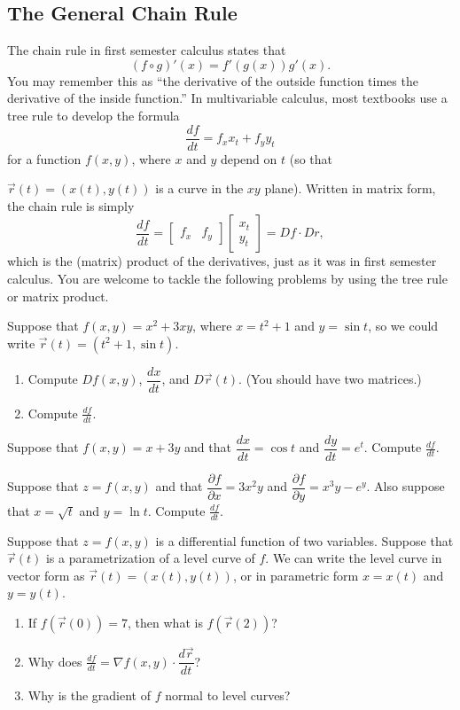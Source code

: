 \subsection{The General Chain Rule}
The chain rule in first semester calculus states that $$(f\circ g)'(x) = f' (g(x))g'(x).$$  You may remember this as  
``the derivative of the outside function times the derivative of the inside function.''  
In multivariable calculus, most textbooks use a tree rule to develop the formula 
$$\frac{df}{dt} = f_xx_t +f_yy_t$$ for a function $f(x,y)$, where $x$ and $y$ depend on $t$ (so that {$\vec r(t)=(x(t),y(t))$ is a curve in the $xy$ plane). 
Written in matrix form, the chain rule is simply $$\frac{df}{dt} = \begin{bmatrix}f_x&f_y\end{bmatrix}\begin{bmatrix}x_t\\ y_t\end{bmatrix} = Df\cdot Dr,$$ which is the (matrix) product of the derivatives, just as it was in first semester calculus. You are welcome to tackle the following problems by using the tree rule or matrix product. 

\begin{problem}
Suppose that $f(x,y)=x^2+3xy$, where $x=t^2+1$ and $y=\sin t$, so we could write $\vec r(t) = (t^2+1, \sin t)$. 
\begin{enumerate}
 \item Compute $Df(x,y)$, $\dfrac{dx}{dt}$, and $D\vec r(t)$. (You should have two matrices.)
 \item Compute $\frac{df}{dt}$.
\end{enumerate}
\end{problem}

\begin{problem}
Suppose that $f(x,y) = x+3y$ and that $\dfrac{dx}{dt}=\cos t$ and $\dfrac{dy}{dt} = e^t$.  Compute $\frac{df}{dt}$. 
\end{problem}

\begin{problem}
Suppose that $z=f(x,y)$ and that $\dfrac{\partial f}{\partial x} = 3x^2y$ and  $\dfrac{\partial f}{\partial y} = x^3y-e^y$.  Also suppose that $x=\sqrt{t}$ and $y = \ln t$.  Compute $\frac{df}{dt}$. 
\end{problem}

\begin{problem}
Suppose that $z=f(x,y)$ is a differential function of two variables. Suppose that $\vec r(t)$ is a parametrization of a level curve of $f$. We can write the level curve in vector form as $\vec r(t) = (x(t),y(t))$, or in parametric form $x=x(t)$ and $y=y(t)$. 
\begin{enumerate}
 \item If $f(\vec r(0))=7$, then what is $f(\vec r(2))$?
 \item Why does $\frac{df}{dt}=\nabla f(x,y)\cdot \dfrac{d\vec r}{dt}$?
 \item Why is the gradient of $f$ normal to level curves?  
\end{enumerate}


\end{problem}}
